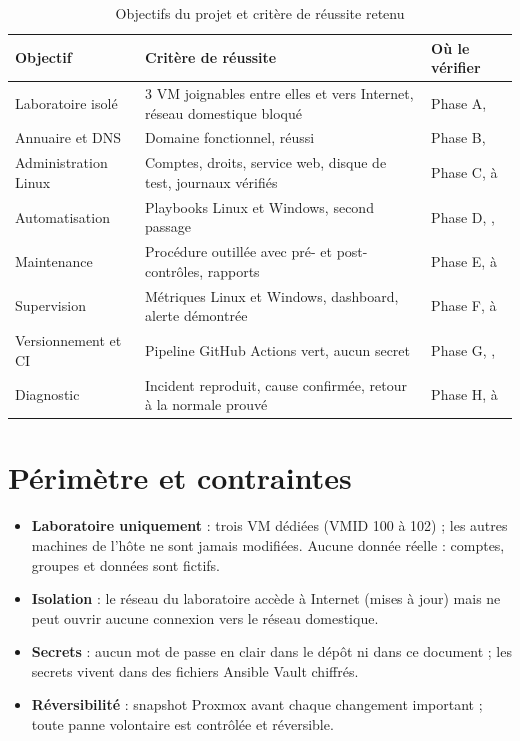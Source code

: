 \begin{table}[H]
\centering
\caption{Objectifs du projet et critère de réussite retenu}\label{tab:objectifs}
\begin{tabularx}{\linewidth}{@{}P{3.6cm}LP{3.2cm}@{}}
\toprule
\textbf{Objectif} & \textbf{Critère de réussite} & \textbf{Où le vérifier} \\
\midrule
Laboratoire isolé & 3 VM joignables entre elles et vers Internet, réseau domestique bloqué & Phase A,  \\
Annuaire et DNS & Domaine  fonctionnel,  réussi & Phase B,  \\
Administration Linux & Comptes, droits, service web, disque de test, journaux vérifiés & Phase C,  à  \\
Automatisation & Playbooks Linux et Windows, second passage  & Phase D, ,  \\
Maintenance & Procédure outillée avec pré- et post-contrôles, rapports & Phase E,  à  \\
Supervision & Métriques Linux et Windows, dashboard, alerte démontrée & Phase F,  à  \\
Versionnement et CI & Pipeline GitHub Actions vert, aucun secret & Phase G, ,  \\
Diagnostic & Incident reproduit, cause confirmée, retour à la normale prouvé & Phase H,  à  \\
\bottomrule
\end{tabularx}
\end{table}

\section{Périmètre et contraintes}

\begin{itemize}
  \item \textbf{Laboratoire uniquement} : trois VM dédiées (VMID 100 à 102) ; les autres machines de
        l'hôte ne sont jamais modifiées. Aucune donnée réelle : comptes, groupes et données sont fictifs.
  \item \textbf{Isolation} : le réseau du laboratoire accède à Internet (mises à jour) mais ne peut
        ouvrir aucune connexion vers le réseau domestique.
  \item \textbf{Secrets} : aucun mot de passe en clair dans le dépôt ni dans ce document ; les
        secrets vivent dans des fichiers Ansible Vault chiffrés.
  \item \textbf{Réversibilité} : snapshot Proxmox avant chaque changement important ; toute panne
        volontaire est contrôlée et réversible.
\end{itemize}

